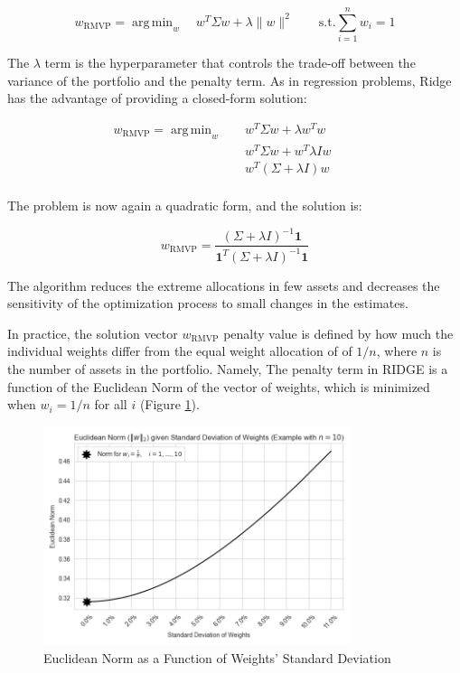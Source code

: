 \documentclass{article}
\DeclareMathOperator*{\argmin}{arg\,min}
\begin{document}
$$
w_{\text{RMVP}} = \argmin_{w} \quad w^{T} \Sigma w + \lambda \|w\|^{2} \quad \quad
\text{s.t.} \sum_{i=1}^{n} w_{i} = 1
$$

The $\lambda$ term is the hyperparameter that controls the trade-off between the variance of the portfolio and the penalty term. As in regression problems, Ridge has the advantage of providing a closed-form solution:

\begin{align*}
w_{\text{RMVP}} = \argmin_{w} & \quad w^{T} \Sigma w + \lambda w^T w \quad \quad \\
                & \quad w^{T} \Sigma w + w^T \lambda I w \quad \quad \\
                & \quad w^{T} (\Sigma + \lambda I) w \quad \quad \\
\end{align*}

The problem is now again a quadratic form, and the solution is:

$$
w_{\text{RMVP}} = \frac{(\Sigma + \lambda I)^{-1} \mathbf{1}}{\mathbf{1}^{T} (\Sigma + \lambda I)^{-1} \mathbf{1}}
$$

The algorithm reduces the extreme allocations in few assets and decreases the sensitivity of the optimization process to small changes in the estimates.

In practice, the solution vector $w_{\text{RMVP}}$ penalty value is defined by how much the individual weights differ from the equal weight allocation of of $1/n$, where $n$ is the number of assets in the portfolio. Namely, The penalty term in RIDGE is a function of the Euclidean Norm of the vector of weights, which is minimized when $w_i = 1/n$ for all $i$ (Figure \ref{fig:euclidean_norm}).

\begin{figure}[h]
    \centering
    \includegraphics[width=0.8\textwidth]{graphics/illustrations/euclidean_norm.png}
    \caption{Euclidean Norm as a Function of Weights' Standard Deviation}
    \label{fig:euclidean_norm}
\end{figure}
\end{document}
